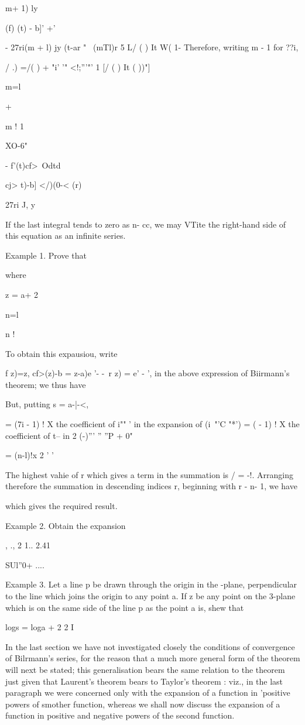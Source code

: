  m+ 1) ly

 (f) (t) - b]' +'

- 27ri(m + l) jy (t-ar " ~(mTl)r 5 L/ ( ) It W( 1- Therefore, writing
m - 1 for ??i,

/ .) =/( ) + "i' '" <!;'''"' 1 [/ ( ) It ( ))"]

m=l

+

m ! 1

XO-6"

- f'(t)cf>\ Odtd

cj> t)-b] </)(0-< (r)

27ri J, y

If the last integral tends to zero as n- cc, we may VTite the
right-hand side of this equation as an infinite series.

Example 1. Prove that

where

z = a+ 2

n=l

n !

To obtain this expausiou, write

f z)=z, cf>(z)-b = z-a)e '- -\ r z) = e' - ', in the above expression
of Biirmann's theorem; we thus have

But, putting s = a-|-<,

= (7i - 1) ! X the coefficient of i"" ' in the expansion of (i~"'C
"*') = ( - 1) ! X the coefficient of t-- in 2 (-)''' '' ''P + 0"

= (n-l)!x 2 ' '

The highest vahie of r which gives a term in the summation is / = -!.
Arranging therefore the summation in descending indices r, beginning
with r - n- 1, we have

which gives the required result.

Example 2. Obtain the expansion

, ., 2 1.. 2.41

SUl''0+ ....

%
%

Example 3. Let a line p be drawn through the origin in the -plane,
perpendicular to the line which joins the origin to any point a. If z
be any point on the 3-plane which is on the same side of the line p as
the point a is, shew that

logs = loga + 2 2 I


In the last section we have not investigated closely the conditions of
convergence of Bilrmann's series, for the reason that a much more
general form of the theorem will next be stated; this generalisation
bears the same relation to the theorem just given that Laurent's
theorem bears to Taylor's theorem : viz., in the last paragraph we
were concerned only with the expansion of a function in 'positive
powers of smother function, whereas we shall now discuss the expansion
of a function in positive and negative powers of the second function.

